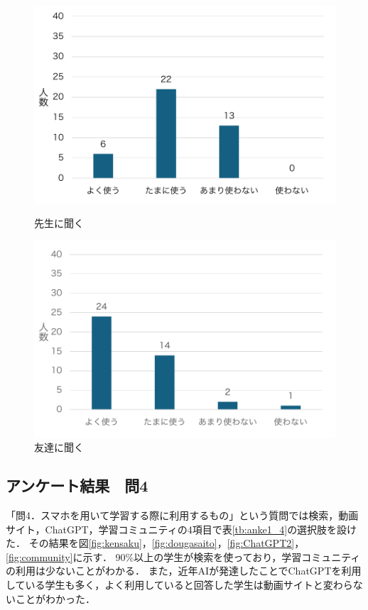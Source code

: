 \documentclass[12pt,a4j,titlepage]{ltjsarticle}
\begin{document}
\begin{figure}[!htb]
\centering
\begin{minipage}[b]{0.49\columnwidth}
    \centering
    \includegraphics[width=1.0\columnwidth]{先生に聞く.pdf}
    \caption{先生に聞く}
    \label{fig:sensei}
\end{minipage}
\begin{minipage}[b]{0.49\columnwidth}
    \centering
    \includegraphics[width=1.0\columnwidth]{友達に聞く.pdf}
    \caption{友達に聞く}
    \label{fig:friends}
\end{minipage}
\end{figure}

\clearpage

\subsection{アンケート結果　問4}
「問4．スマホを用いて学習する際に利用するもの」という質問では検索，動画サイト，ChatGPT，学習コミュニティの4項目で表\ref{tb:anke1_4}の選択肢を設けた．
その結果を図\ref{fig:kensaku}，\ref{fig:dougasaito}，\ref{fig:ChatGPT2}，\ref{fig:community}に示す．
90\%以上の学生が検索を使っており，学習コミュニティの利用は少ないことがわかる．
また，近年AIが発達したことでChatGPTを利用している学生も多く，よく利用していると回答した学生は動画サイトと変わらないことがわかった．
\end{document}
